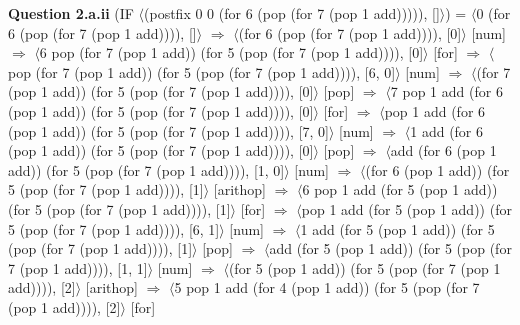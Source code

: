 \documentclass[12pt]{report}
\begin{document}
{\bf Question 2.a.ii} \newline
(IF $\langle$(postfix 0 0 (for 6 (pop (for 7 (pop 1 add))))), []$\rangle$) \newline
= $\langle$0 (for 6 (pop (for 7 (pop 1 add)))), []$\rangle$ \newline
$\Rightarrow$ $\langle$(for 6 (pop (for 7 (pop 1 add)))), [0]$\rangle$ \hfill [num] \newline
$\Rightarrow$ $\langle$6 pop (for 7 (pop 1 add)) (for 5 (pop (for 7 (pop 1 add)))), [0]$\rangle$ \hfill [for] \newline
$\Rightarrow$ $\langle$pop (for 7 (pop 1 add)) (for 5 (pop (for 7 (pop 1 add)))), [6, 0]$\rangle$ \hfill [num] \newline
$\Rightarrow$ $\langle$(for 7 (pop 1 add)) (for 5 (pop (for 7 (pop 1 add)))), [0]$\rangle$ \hfill [pop] \newline
$\Rightarrow$ $\langle$7 pop 1 add (for 6 (pop 1 add)) (for 5 (pop (for 7 (pop 1 add)))), [0]$\rangle$ \hfill [for] \newline
$\Rightarrow$ $\langle$pop 1 add (for 6 (pop 1 add)) (for 5 (pop (for 7 (pop 1 add)))), [7, 0]$\rangle$ \hfill [num] \newline
$\Rightarrow$ $\langle$1 add (for 6 (pop 1 add)) (for 5 (pop (for 7 (pop 1 add)))), [0]$\rangle$ \hfill [pop] \newline
$\Rightarrow$ $\langle$add (for 6 (pop 1 add)) (for 5 (pop (for 7 (pop 1 add)))), [1, 0]$\rangle$ \hfill [num] \newline
$\Rightarrow$ $\langle$(for 6 (pop 1 add)) (for 5 (pop (for 7 (pop 1 add)))), [1]$\rangle$ \hfill [arithop] \newline
$\Rightarrow$ $\langle$6 pop 1 add (for 5 (pop 1 add)) (for 5 (pop (for 7 (pop 1 add)))), [1]$\rangle$ \hfill [for] \newline
$\Rightarrow$ $\langle$pop 1 add (for 5 (pop 1 add)) (for 5 (pop (for 7 (pop 1 add)))), [6, 1]$\rangle$ \hfill [num] \newline
$\Rightarrow$ $\langle$1 add (for 5 (pop 1 add)) (for 5 (pop (for 7 (pop 1 add)))), [1]$\rangle$ \hfill [pop] \newline
$\Rightarrow$ $\langle$add (for 5 (pop 1 add)) (for 5 (pop (for 7 (pop 1 add)))), [1, 1]$\rangle$ \hfill [num] \newline
$\Rightarrow$ $\langle$(for 5 (pop 1 add)) (for 5 (pop (for 7 (pop 1 add)))), [2]$\rangle$ \hfill [arithop] \newline
$\Rightarrow$ $\langle$5 pop 1 add (for 4 (pop 1 add)) (for 5 (pop (for 7 (pop 1 add)))), [2]$\rangle$ \hfill [for] \newline
\end{document}
